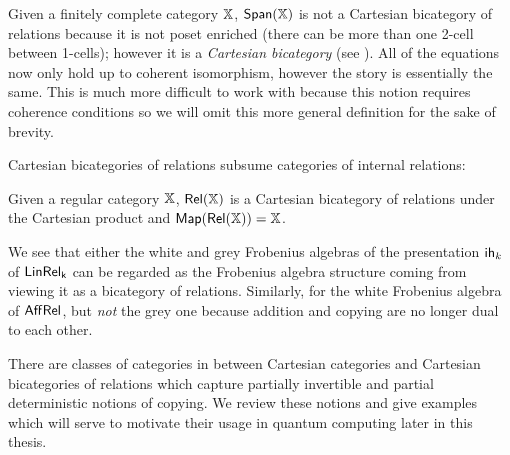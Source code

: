 
Given a finitely complete category $\mathbb{X}$, $\mathsf{Span}(\mathbb{X})$ is not a Cartesian bicategory of relations because it is not poset enriched (there can be more than one 2-cell between 1-cells); however it is a {\em Cartesian bicategory} (see \cite{carbonia}).  All of the equations now only hold up to coherent isomorphism, however the story is essentially the same. This is much more difficult to work with because this notion requires coherence conditions so we will omit this more general definition for the sake of brevity. 


Cartesian bicategories of relations subsume categories of internal relations:
\begin{example}
Given a regular category $\mathbb{X}$, $\mathsf{Rel}(\mathbb{X})$ is a Cartesian bicategory of relations under the Cartesian product and ${\sf Map}(\mathsf{Rel}(\mathbb{X}))=\mathbb{X}$.
\end{example}
We see that either the white and grey Frobenius algebras of the presentation ${\sf ih}_k$ of $\sf LinRel_k$ can be regarded as the Frobenius algebra structure coming from viewing it as a bicategory of relations.  Similarly, for the white Frobenius algebra of  $\mathsf{Aff}\mathsf{Rel}$, but {\em not} the grey one because addition and copying are no longer dual to each other.




There are classes of categories in between Cartesian categories and Cartesian bicategories of relations which capture partially invertible and partial deterministic notions of copying.  We review these notions and give examples which will serve to motivate their usage in quantum computing later in this thesis.





